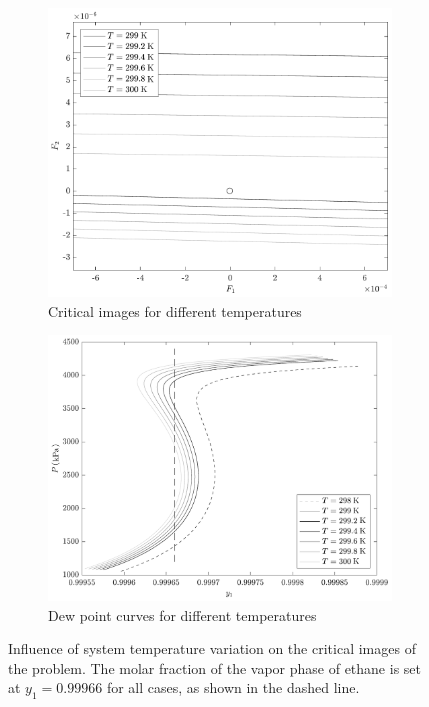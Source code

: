 \documentclass[journal=iecred,manuscript=article]{achemso}
\theoremstyle{definition}
\theoremstyle{remark}
\begin{document}
\begin{figure}
\centering
\begin{subfigure}{.5\textwidth}
  \centering
  \includegraphics[width=0.95\columnwidth]{variacao_temperatura.pdf}
  \caption{Critical images for different temperatures}
  \label{fig:critical_images_temeprature_variation}
\end{subfigure}%
\begin{subfigure}{.5\textwidth}
  \centering
  \includegraphics[width=0.95\columnwidth]{variacao_temperatura_ponto_bolha.pdf}
  \caption{Dew point curves for different temperatures}
  \label{fig:bubble_curves_temeprature_variation}
\end{subfigure}
\caption{Influence of system temperature variation on the critical images of the problem. The molar fraction of the vapor phase of ethane is set at $ y_1 = 0.99966 $ for all cases, as shown in the dashed line.}
\label{fig:domain_image_r}
\end{figure}
\end{document}
